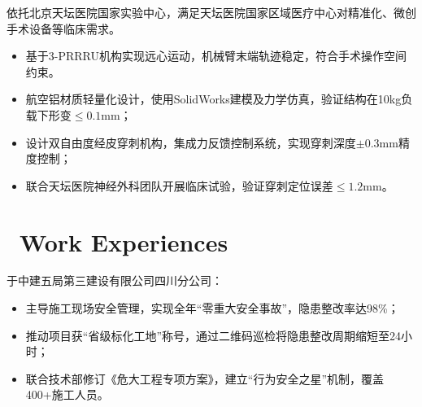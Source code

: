 \documentclass{resume}
\begin{document}
依托北京天坛医院国家实验中心，满足天坛医院国家区域医疗中心对精准化、微创手术设备等临床需求。
\begin{itemize}[parsep=0.5ex,label=]
  \item 基于3-PRRRU机构实现远心运动，机械臂末端轨迹稳定，符合手术操作空间约束。
  \item 航空铝材质轻量化设计，使用SolidWorks建模及力学仿真，验证结构在10kg负载下形变$\le0.1$mm；
  \item 设计双自由度经皮穿刺机构，集成力反馈控制系统，实现穿刺深度$\pm0.3$mm精度控制；
  \item 联合天坛医院神经外科团队开展临床试验，验证穿刺定位误差$\le1.2$mm。
\end{itemize}
\section{ \ Work Experiences}


  于中建五局第三建设有限公司四川分公司：
\begin{itemize}[parsep=0.45ex,label=]
  \item 主导施工现场安全管理，实现全年“零重大安全事故”，隐患整改率达98\%；
  \item 推动项目获“省级标化工地”称号，通过二维码巡检将隐患整改周期缩短至24小时；
  \item 联合技术部修订《危大工程专项方案》，建立“行为安全之星”机制，覆盖400+施工人员。
\end{itemize}





\end{document}
